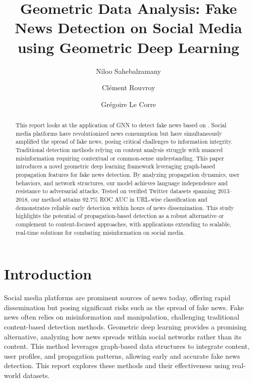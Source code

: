 \documentclass[sigconf,nonacm]{acmart}
\begin{document}
\title{Geometric Data Analysis: Fake News Detection on Social Media using Geometric Deep Learning\\
\vspace{0.5em}} %


\author{Niloo Sahebalzamany}

\author{Clément Rouvroy}

\author{Grégoire Le Corre}



\begin{abstract}
This report looks at the application of GNN to detect fake news based on \cite{monti2019fakenewsdetectionsocial}. Social media platforms have revolutionized news consumption but have simultaneously amplified the spread of fake news, posing critical challenges to information integrity. Traditional detection methods relying on content analysis struggle with nuanced misinformation requiring contextual or common-sense understanding. This paper introduces a novel geometric deep learning framework leveraging graph-based propagation features for fake news detection. By analyzing propagation dynamics, user behaviors, and network structures, our model achieves language independence and resistance to adversarial attacks. Tested on verified Twitter datasets spanning 2013–2018, our method attains 92.7\% ROC AUC in URL-wise classification and demonstrates reliable early detection within hours of news dissemination. This study highlights the potential of propagation-based detection as a robust alternative or complement to content-focused approaches, with applications extending to scalable, real-time solutions for combating misinformation on social media.
\end{abstract}

\maketitle

\section{Introduction}
Social media platforms are prominent sources of news today, offering rapid dissemination but posing significant risks such as the spread of fake news. Fake news often relies on misinformation and manipulation, challenging traditional content-based detection methods. Geometric deep learning provides a promising alternative, analyzing how news spreads within social networks rather than its content. This method leverages graph-based data structures to integrate content, user profiles, and propagation patterns, allowing early and accurate fake news detection. This report explores these methods and their effectiveness using real-world datasets.
\end{document}
